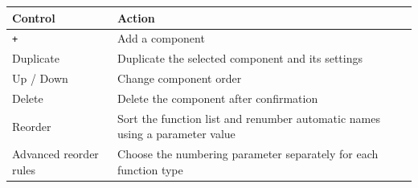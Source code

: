 \documentclass[
  10pt,
  a4paper,
  oneside]{scrreprt}
\begin{document}
\begin{longtable}[]{@{}ll@{}}
\toprule
\begin{minipage}[b]{0.47\columnwidth}\raggedright
Control\strut
\end{minipage} & \begin{minipage}[b]{0.47\columnwidth}\raggedright
Action\strut
\end{minipage}\tabularnewline
\midrule
\endhead
\begin{minipage}[t]{0.47\columnwidth}\raggedright
\texttt{+}\strut
\end{minipage} & \begin{minipage}[t]{0.47\columnwidth}\raggedright
Add a component\strut
\end{minipage}\tabularnewline
\begin{minipage}[t]{0.47\columnwidth}\raggedright
Duplicate\strut
\end{minipage} & \begin{minipage}[t]{0.47\columnwidth}\raggedright
Duplicate the selected component and its settings\strut
\end{minipage}\tabularnewline
\begin{minipage}[t]{0.47\columnwidth}\raggedright
Up / Down\strut
\end{minipage} & \begin{minipage}[t]{0.47\columnwidth}\raggedright
Change component order\strut
\end{minipage}\tabularnewline
\begin{minipage}[t]{0.47\columnwidth}\raggedright
Delete\strut
\end{minipage} & \begin{minipage}[t]{0.47\columnwidth}\raggedright
Delete the component after confirmation\strut
\end{minipage}\tabularnewline
\begin{minipage}[t]{0.47\columnwidth}\raggedright
Reorder\strut
\end{minipage} & \begin{minipage}[t]{0.47\columnwidth}\raggedright
Sort the function list and renumber automatic names using a parameter
value\strut
\end{minipage}\tabularnewline
\begin{minipage}[t]{0.47\columnwidth}\raggedright
Advanced reorder rules\strut
\end{minipage} & \begin{minipage}[t]{0.47\columnwidth}\raggedright
Choose the numbering parameter separately for each function type\strut

\end{minipage}
\end{longtable}
\end{document}
